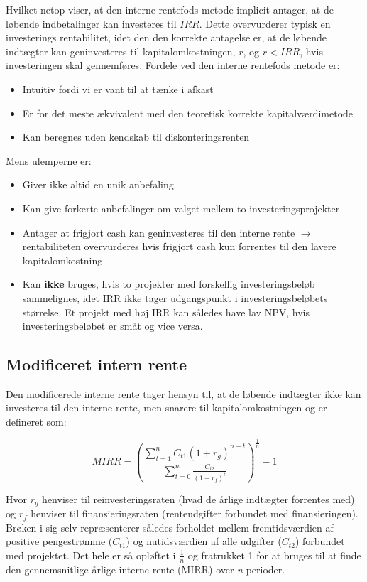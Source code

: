 \documentclass[10pt,reqno, usenames]{article}
\begin{document}
Hvilket netop viser, at den interne rentefods metode implicit antager, at de løbende indbetalinger kan investeres til $IRR$. Dette overvurderer typisk en investerings rentabilitet, idet den den korrekte antagelse er, at de løbende indtægter kan geninvesteres til kapitalomkostningen, $r$, og $r<IRR$, hvis investeringen skal gennemføres. Fordele ved den interne rentefods metode er: 

\begin{itemize}
    \item Intuitiv fordi vi er vant til at tænke i afkast
    \item Er for det meste ækvivalent med den teoretisk korrekte kapitalværdimetode
    \item Kan beregnes uden kendskab til diskonteringsrenten
\end{itemize}

Mens ulemperne er: 

\begin{itemize}
    \item Giver ikke altid en unik anbefaling
    \item Kan give forkerte anbefalinger om valget mellem to investeringsprojekter
    \item Antager at frigjort cash kan geninvesteres til den interne rente \(\rightarrow\) rentabiliteten overvurderes hvis frigjort cash kun forrentes til den lavere kapitalomkostning
    \item Kan \textbf{ikke} bruges, hvis to projekter med forskellig investeringsbeløb sammelignes, idet IRR ikke tager udgangspunkt i investeringsbeløbets størrelse. Et projekt med høj IRR kan således have lav NPV, hvis investeringsbeløbet er småt og vice versa. 
\end{itemize}

\subsection{Modificeret intern rente}
Den modificerede interne rente tager hensyn til, at de løbende indtægter ikke kan investeres til den interne rente, men snarere til kapitalomkostningen og er defineret som: 

\begin{equation}
MIRR = \left( \frac{\sum_{t=1}^{n} C_{t1} (1 + r_g)^{n-t}}{\sum_{t=0}^{n} \frac{C_{t2}}{(1 + r_f)^t}} \right)^{\frac{1}{n}} - 1
\end{equation}

Hvor $r_g$ henviser til reinvesteringsraten (hvad de årlige indtægter forrentes med) og $r_f$ henviser til finansieringsraten (renteudgifter forbundet med finansieringen). Brøken i sig selv repræsenterer således forholdet mellem fremtidsværdien af positive pengestrømme ($C_{t1}$) og nutidsværdien af alle udgifter ($C_{t2}$) forbundet med projektet. Det hele er så opløftet i $\frac{1}{n}$ og fratrukket 1 for at bruges til at finde den gennemsnitlige årlige interne rente (MIRR) over \textit{n} perioder.
\end{document}
